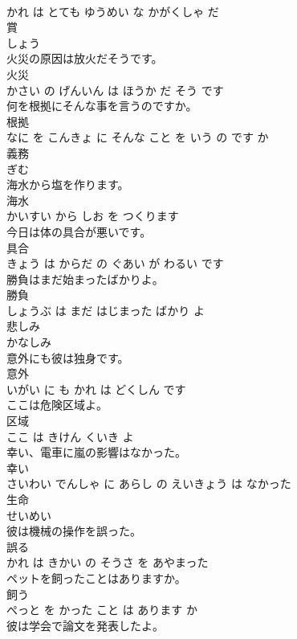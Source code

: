 \documentclass[8pt]{extreport}
\begin{document}
\begin{CJK}{UTF8}{min}
\\	かれ は とても ゆうめい な かがくしゃ だ			
\\	賞	
\\	しょう		
\\	火災の原因は放火だそうです。	
\\	火災 
\\	かさい の げんいん は ほうか だ そう です			
\\	何を根拠にそんな事を言うのですか。	
\\	根拠 
\\	なに を こんきょ に そんな こと を いう の です か			
\\	義務	
\\	ぎむ		
\\	海水から塩を作ります。	
\\	海水 
\\	かいすい から しお を つくります			
\\	今日は体の具合が悪いです。	
\\	具合 
\\	きょう は からだ の ぐあい が わるい です			
\\	勝負はまだ始まったばかりよ。	
\\	勝負 
\\	しょうぶ は まだ はじまった ばかり よ			
\\	悲しみ	
\\	かなしみ		
\\	意外にも彼は独身です。	
\\	意外 
\\	いがい に も かれ は どくしん です			
\\	ここは危険区域よ。	
\\	区域 
\\	ここ は きけん くいき よ			
\\	幸い、電車に嵐の影響はなかった。	
\\	幸い 
\\	さいわい でんしゃ に あらし の えいきょう は なかった			
\\	生命	
\\	せいめい		
\\	彼は機械の操作を誤った。	
\\	誤る 
\\	かれ は きかい の そうさ を あやまった			
\\	ペットを飼ったことはありますか。	
\\	飼う 
\\	ぺっと を かった こと は あります か			
\\	彼は学会で論文を発表したよ。	

\end{CJK}
\end{document}
